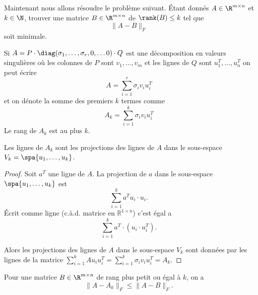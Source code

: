 Maintenant nous allons résoudre le problème suivant. Étant donnés $A \in \R^{m \times n}$ et $k \in \N$, trouver une matrice $B \in \R^{m \times n}$ de $\rank(B) \leq  k$ tel que 
\begin{displaymath}
  \|A - B\|_F
\end{displaymath}
soit minimale. 

Si $A = P \cdot \diag(\sigma_1,\dots,\sigma_r,0,\dots 0) \cdot Q$ est une décomposition en valeurs singulières où les colonnes de $P$ sont $v_1,\dots,v_m$ et les lignes de $Q$ sont $u_1^T,\dots,u_n^T$ on peut écrire
\begin{equation}
  \label{eq:18}
  A = \sum_{i=1}^r \sigma_i v_iu_i^T
\end{equation}
et on dénote la somme des premiers $k$ termes comme 
\begin{displaymath}
  A_k = \sum_{i=1}^k \sigma_i v_iu_i^T
\end{displaymath}
Le rang de $A_k$ est au plus $k$. 

\begin{lemma}
  \label{lem:12}
  Les lignes de $A_k$ sont les projections des lignes de $A$ dans le sous-espace $V_k = \spa\{u_1,\dots,u_k\}$. 
\end{lemma}

\begin{proof}
  Soit $a^T$ une ligne de $A$. La projection de $a$ dans le sous-espace $\spa\{u_1,\dots,u_k\}$ est 
  \begin{displaymath}
    \sum_{i=1}^k a^Tu_i \cdot u_i. 
  \end{displaymath}
  Écrit comme ligne (c.à.d. matrice en $ℝ^{1 × n}$) c'est égal a
 \begin{displaymath}
    \sum_{i=1}^k a^T ⋅ (u_i \cdot u_i^T). 
  \end{displaymath}
  
Alors les projections des lignes de $A$ dans le sous-espace $V_k$ sont données par les lignes de la matrice $\sum_{i=1}^k A u_i u_i^T = \sum_{i=1}^k \sigma_i v_i u_i^T = A_k$.  
\end{proof}

\begin{theorem}
  \label{thr:27}
  Pour une matrice $B \in \R^{m \times n}$ de rang plus petit ou égal à $k$, on a 
  \begin{displaymath}
    \|A - A_k\|_F \leq \|A - B\|_F.
  \end{displaymath}
\end{theorem}

